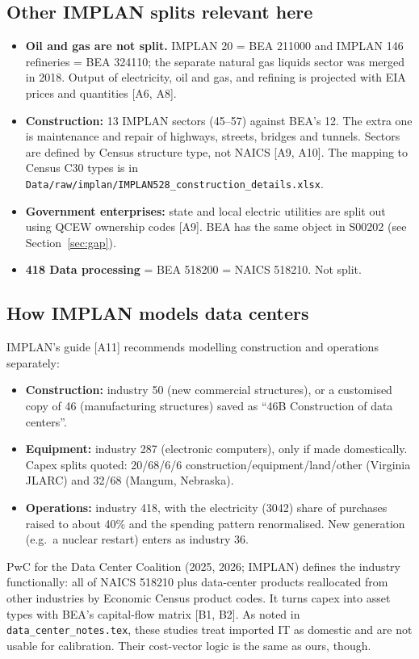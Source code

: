 \documentclass[11pt]{article}
\begin{document}
\subsection{Other IMPLAN splits relevant here}
\begin{itemize}
  \item \textbf{Oil and gas are not split.} IMPLAN 20 = BEA 211000 and IMPLAN 146 refineries = BEA 324110; the separate natural gas liquids sector was merged in 2018. Output of electricity, oil and gas, and refining is projected with EIA prices and quantities [A6, A8].
  \item \textbf{Construction:} 13 IMPLAN sectors (45--57) against BEA's 12. The extra one is maintenance and repair of highways, streets, bridges and tunnels. Sectors are defined by Census structure type, not NAICS [A9, A10]. The mapping to Census C30 types is in \texttt{Data/raw/implan/IMPLAN528\_construction\_details.xlsx}.
  \item \textbf{Government enterprises:} state and local electric utilities are split out using QCEW ownership codes [A9]. BEA has the same object in S00202 (see Section~\ref{sec:gap}).
  \item \textbf{418 Data processing} = BEA 518200 = NAICS 518210. Not split.
\end{itemize}

\subsection{How IMPLAN models data centers}
IMPLAN's guide [A11] recommends modelling construction and operations separately:
\begin{itemize}
  \item \textbf{Construction:} industry 50 (new commercial structures), or a customised copy of 46 (manufacturing structures) saved as ``46B Construction of data centers''.
  \item \textbf{Equipment:} industry 287 (electronic computers), only if made domestically. Capex splits quoted: 20/68/6/6 construction/equipment/land/other (Virginia JLARC) and 32/68 (Mangum, Nebraska).
  \item \textbf{Operations:} industry 418, with the electricity (3042) share of purchases raised to about 40\% and the spending pattern renormalised. New generation (e.g.\ a nuclear restart) enters as industry 36.
\end{itemize}
PwC for the Data Center Coalition (2025, 2026; IMPLAN) defines the industry functionally: all of NAICS 518210 plus data-center products reallocated from other industries by Economic Census product codes. It turns capex into asset types with BEA's capital-flow matrix [B1, B2]. As noted in \texttt{data\_center\_notes.tex}, these studies treat imported IT as domestic and are not usable for calibration. Their cost-vector logic is the same as ours, though.
\end{document}
